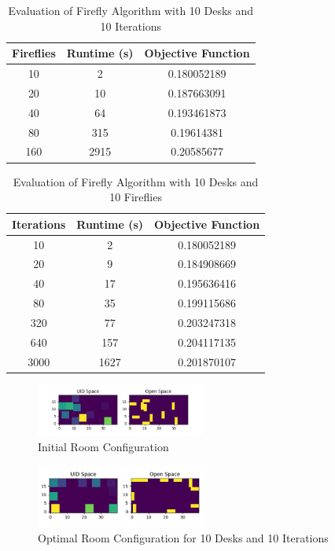 \documentclass[sigconf,authordraft]{acmart}
\begin{document}
\begin{table}
    \centering
    \caption{Evaluation of Firefly Algorithm with 10 Desks and 10 Iterations}
    \label{eval_table1}
    \begin{tabular}{|c|c|c|}
        \hline
        \textbf{Fireflies} & \textbf{Runtime (s)} & \textbf{Objective Function} \\
        \hline
        10 & 2 & 0.180052189 \\
        20 & 10 & 0.187663091 \\
        40 & 64 & 0.193461873 \\
        80 & 315 & 0.19614381 \\
        160 & 2915 & 0.20585677 \\
        \hline
    \end{tabular}
\end{table}

\begin{table}
    \centering
    \caption{Evaluation of Firefly Algorithm with 10 Desks and 10 Fireflies}
    \label{eval_table2}
    \begin{tabular}{|c|c|c|}
        \hline
        \textbf{Iterations} & \textbf{Runtime (s)} & \textbf{Objective Function}\\
        \hline
        10 & 2 & 0.180052189 \\
        20 & 9 & 0.184908669 \\
        40 & 17 & 0.195636416 \\
        80 & 35 & 0.199115686 \\
        320 & 77 & 0.203247318 \\
        640 & 157 & 0.204117135 \\
        3000 & 1627 & 0.201870107 \\
        \hline
    \end{tabular}
\end{table}

\begin{figure}
    \centering
    \includegraphics[width=0.5\textwidth]{conor_init_room.png}
    \caption{Initial Room Configuration}
    \label{initial_setup}
\end{figure}

\begin{figure}
    \centering
    \includegraphics[width=0.5\textwidth]{conor_final_room.png}
    \caption{Optimal Room Configuration for 10 Desks and 10 Iterations}
    \label{final_setup1}
\end{figure}
\end{document}
